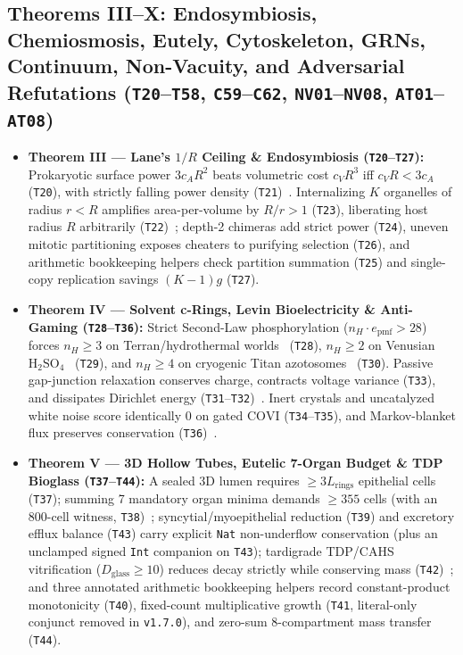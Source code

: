\documentclass[11pt,reqno]{amsart}
\theoremstyle{plain}
\theoremstyle{definition}
\theoremstyle{remark}
\newcommand{\code}[1]{{\footnotesize\nolinkurl{#1}}}
\begin{document}
\subsection{Theorems III--X: Endosymbiosis, Chemiosmosis, Eutely, Cytoskeleton, GRNs, Continuum, Non-Vacuity, and Adversarial Refutations (\texttt{T20}--\texttt{T58}, \texttt{C59}--\texttt{C62}, \texttt{NV01}--\texttt{NV08}, \texttt{AT01}--\texttt{AT08})}
\begin{itemize}[leftmargin=1.6em, itemsep=2pt]
  \item \textbf{Theorem III --- Lane's $1/R$ Ceiling \& Endosymbiosis (\texttt{T20}--\texttt{T27}):} Prokaryotic surface power $3 c_A R^2$ beats volumetric cost $c_V R^3$ iff $c_V R < 3 c_A$ (\texttt{T20}), with strictly falling power density (\texttt{T21})~\cite{lane2010}. Internalizing $K$ organelles of radius $r < R$ amplifies area-per-volume by $R/r > 1$ (\texttt{T23}), liberating host radius $R$ arbitrarily (\texttt{T22})~\cite{margulis1967}; depth-2 chimeras add strict power (\texttt{T24}), uneven mitotic partitioning exposes cheaters to purifying selection (\texttt{T26}), and arithmetic bookkeeping helpers check partition summation (\texttt{T25}) and single-copy replication savings $(K-1)g$ (\texttt{T27}).
  \item \textbf{Theorem IV --- Solvent c-Rings, Levin Bioelectricity \& Anti-Gaming (\texttt{T28}--\texttt{T36}):} Strict Second-Law phosphorylation ($n_H \cdot e_{\mathrm{pmf}} > 28$) forces $n_H \ge 3$ on Terran/hydrothermal worlds~\cite{caforio2017} (\texttt{T28}), $n_H \ge 2$ on Venusian $\mathrm{H}_2\mathrm{SO}_4$~\cite{seager2023,seager2024} (\texttt{T29}), and $n_H \ge 4$ on cryogenic Titan azotosomes~\cite{stevenson2015} (\texttt{T30}). Passive gap-junction relaxation conserves charge, contracts voltage variance (\texttt{T33}), and dissipates Dirichlet energy (\texttt{T31}--\texttt{T32})~\cite{levin2022}. Inert crystals and uncatalyzed white noise score identically $0$ on gated $\mathrm{COVI}$ (\texttt{T34}--\texttt{T35}), and Markov-blanket flux preserves conservation (\texttt{T36})~\cite{krakauer2020,hoshika2019}.
  \item \textbf{Theorem V --- 3D Hollow Tubes, Eutelic 7-Organ Budget \& TDP Bioglass (\texttt{T37}--\texttt{T44}):} A sealed 3D lumen requires $\ge 3 L_{\mathrm{rings}}$ epithelial cells (\texttt{T37}); summing 7 mandatory organ minima demands $\ge 355$ cells (with an 800-cell witness, \texttt{T38})~\cite{szigeti2014}; syncytial/myoepithelial reduction (\texttt{T39}) and excretory efflux balance (\texttt{T43}) carry explicit \code{Nat} non-underflow conservation (plus an unclamped signed \code{Int} companion on \texttt{T43}); tardigrade TDP/CAHS vitrification ($D_{\mathrm{glass}} \ge 10$) reduces decay strictly while conserving mass (\texttt{T42})~\cite{boothby2017,hashimoto2016}; and three annotated arithmetic bookkeeping helpers record constant-product monotonicity (\texttt{T40}), fixed-count multiplicative growth (\texttt{T41}, literal-only conjunct removed in \texttt{v1.7.0}), and zero-sum 8-compartment mass transfer (\texttt{T44}).

\end{itemize}
\end{document}
